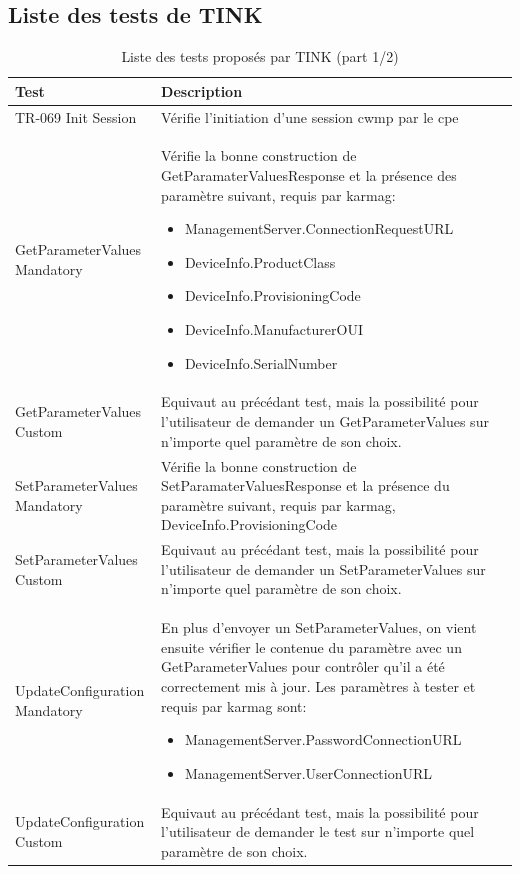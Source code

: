 \documentclass[12pt,a4paper]{report}
\begin{document}
\begin{appendix}
\chapter{Liste des tests de TINK}
\begin{table}
	\begin{tabularx}{17cm}{|l|X|}
		\hline
		Test & Description\tabularnewline
		\hline
		TR-069 Init Session & Vérifie l'initiation d'une session \gls{cwmp} par le \gls{cpe}\tabularnewline
		\hline
		GetParameterValues Mandatory & Vérifie la bonne construction de GetParamaterValuesResponse et la présence des paramètre suivant, requis par \gls{karmag}: 
		\begin{itemize}
		\item ManagementServer.ConnectionRequestURL
		\item DeviceInfo.ProductClass
		\item DeviceInfo.ProvisioningCode
		\item DeviceInfo.ManufacturerOUI
		\item DeviceInfo.SerialNumber
		\end{itemize}		\tabularnewline		
		\hline
		GetParameterValues Custom & Equivaut au précédant test, mais la possibilité pour l'utilisateur de demander un GetParameterValues sur n'importe quel paramètre de son choix.\tabularnewline
		\hline
		SetParameterValues Mandatory & Vérifie la bonne construction de SetParamaterValuesResponse et la présence du paramètre suivant, requis par \gls{karmag}, DeviceInfo.ProvisioningCode\tabularnewline
		\hline
		SetParameterValues Custom & Equivaut au précédant test, mais la possibilité pour l'utilisateur de demander un SetParameterValues sur n'importe quel paramètre de son choix.\tabularnewline
		\hline
		UpdateConfiguration Mandatory & En plus d'envoyer un SetParameterValues, on vient ensuite vérifier le contenue du paramètre avec un GetParameterValues pour contrôler qu'il a été correctement mis à jour. Les paramètres à tester et requis par \gls{karmag} sont: 
		\begin{itemize}
		\item ManagementServer.PasswordConnectionURL
		\item ManagementServer.UserConnectionURL
		\end{itemize} \tabularnewline
		\hline
		UpdateConfiguration Custom & Equivaut au précédant test, mais la possibilité pour l'utilisateur de demander le test sur n'importe quel paramètre de son choix.\tabularnewline
		\hline
		\hline
		\end{tabularx}
	\centering
	\caption{Liste des tests proposés par TINK (part 1/2)}
\end{table}


\end{appendix}
\end{document}
